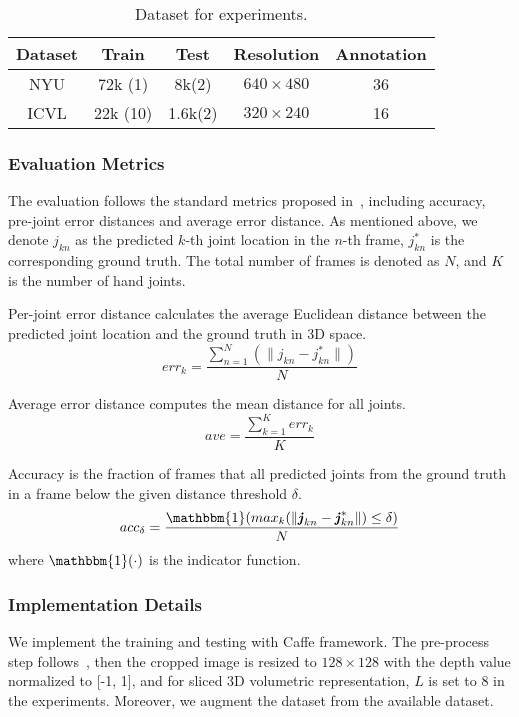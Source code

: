 \documentclass[journal,comsoc]{IEEEtran}
\let\MYoriglatexcaption\caption
\renewcommand{\caption}[2][\relax]{\MYoriglatexcaption[#2]{#2}}
\def \j{\bm{\mathit{j}}}
\begin{document}
\begin{table}[htbp]
\centering
\caption{Dataset for experiments.}
\begin{tabular}{c|c|c|c|c}
    \hline
    \textbf{Dataset} & \textbf{Train}     & \textbf{Test}    & \textbf{Resolution} &\textbf{Annotation}\\
    \hline
    NYU     & 72k (1)   & 8k(2)   & $640\times480$  & 36\\
    ICVL    & 22k (10)  & 1.6k(2) & $320\times240$  & 16\\
    \hline
\end{tabular}
\label{tab:datasets}
\end{table}

\subsubsection{Evaluation Metrics}\label{sec:evaluation metrics}
The evaluation follows the standard metrics proposed in~\cite{oberweger2015hands}, including accuracy,
pre-joint error distances and average error distance. As mentioned above, we denote $\j_{kn}$ as
the predicted $k$-th joint location in the $n$-th frame, $\j_{kn}^{*}$ is the corresponding ground
truth. The total number of frames is denoted as $N$, and $K$ is the number of hand joints.

Per-joint error distance calculates the average Euclidean distance between the predicted
joint location and the ground truth in 3D space.
\begin{equation}
err_k = \frac{\sum_{n=1}^N(\|\j_{kn} - \j_{kn}^{*} \|)}{N}
\end{equation}

Average error distance computes the mean distance for all joints.
\begin{equation}
ave = \frac{\sum_{k=1}^K{err_k}}{K}
\end{equation}

Accuracy is the fraction of frames that all predicted joints from the ground truth in a
frame below the given distance threshold $\delta$.
\begin{equation}
acc_{\delta} = \frac{\mathbbm{1}(max_k(\| \j_{kn} - \j_{kn}^{*}\|) \leq \delta)}{N}
\end{equation}
where $\mathbbm{1}(\cdot)$ is the indicator function.

\subsubsection{Implementation Details}\label{sec:implementation}
We implement the training and testing with Caffe\cite{jia2014caffe} framework. The pre-process step
follows~\cite{oberweger2015hands}, then the cropped image is resized to $128 \times 128$ with the
depth value normalized to [-1, 1], and for sliced 3D volumetric representation, $L$ is set to 8
in the experiments. Moreover, we augment the dataset from the available dataset.
\end{document}
